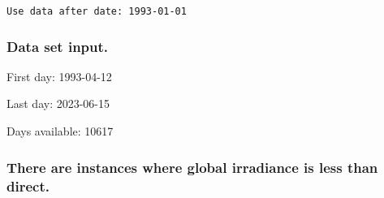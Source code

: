 \documentclass[
  10pt,
  a4paper,oneside]{article}
\newenvironment{Shaded}{\begin{snugshade}}{\end{snugshade}}
\newcommand{\CommentTok}[1]{\textcolor[rgb]{0.56,0.35,0.01}{\textit{#1}}}
\newcommand{\DecValTok}[1]{\textcolor[rgb]{0.00,0.00,0.81}{#1}}
\newcommand{\ErrorTok}[1]{\textcolor[rgb]{0.64,0.00,0.00}{\textbf{#1}}}
\newcommand{\KeywordTok}[1]{\textcolor[rgb]{0.13,0.29,0.53}{\textbf{#1}}}
\newcommand{\NormalTok}[1]{#1}
\newcommand{\OperatorTok}[1]{\textcolor[rgb]{0.81,0.36,0.00}{\textbf{#1}}}
\newcommand{\StringTok}[1]{\textcolor[rgb]{0.31,0.60,0.02}{#1}}
\begin{document}
\begin{verbatim}
Use data after date: 1993-01-01 
\end{verbatim}

\begin{Shaded}
\end{Shaded}

\hypertarget{data-set-input.}{%
\subsubsection{Data set input.}\label{data-set-input.}}

First day: 1993-04-12

Last day: 2023-06-15

Days available: 10617

\begin{Shaded}
\end{Shaded}

\hypertarget{there-are-instances-where-global-irradiance-is-less-than-direct.}{%
\subsubsection{There are instances where global irradiance is less than direct.}\label{there-are-instances-where-global-irradiance-is-less-than-direct.}}
\end{document}
